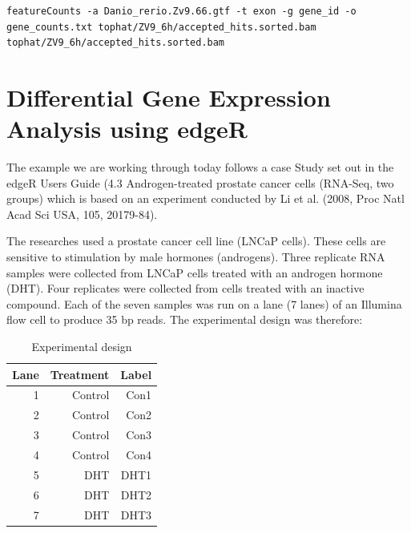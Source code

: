 \begin{steps}
\begin{lstlisting}[style=command_syntax]
featureCounts -a Danio_rerio.Zv9.66.gtf -t exon -g gene_id -o gene_counts.txt tophat/ZV9_6h/accepted_hits.sorted.bam tophat/ZV9_6h/accepted_hits.sorted.bam
\end{lstlisting}
\end{steps}


\newpage
\section{Differential Gene Expression Analysis using edgeR}

\begin{information}
The example we are working through today follows a case Study set out in the edgeR Users
Guide (4.3 Androgen-treated prostate cancer cells (RNA-Seq, two groups) which is based on
an experiment conducted by Li et al. (2008, Proc Natl Acad Sci USA, 105, 20179-84).

The researches used a prostate cancer cell line (LNCaP cells). These cells are sensitive
to stimulation by male hormones (androgens). Three replicate RNA samples were collected
from LNCaP cells treated with an androgen hormone (DHT). Four replicates were collected
from cells treated with an inactive compound. Each of the seven samples was run on a
lane (7 lanes) of an Illumina flow cell to produce 35 bp reads. The experimental design
was therefore:

\begin{table}[H]
  \centering
  \caption{Experimental design}
    \begin{tabular}{rrr}
    \toprule
    \textbf{Lane} & \textbf{Treatment} & \textbf{Label} \\
    \midrule
    1    & Control & Con1 \\
    2    & Control & Con2 \\
    3    & Control & Con3 \\
    4    & Control & Con4 \\
    5    & DHT & DHT1 \\
    6    & DHT & DHT2 \\
    7    & DHT & DHT3 \\

    \bottomrule
    \end{tabular}
  \label{tab:experimental_design}
\end{table}
\end{information}

